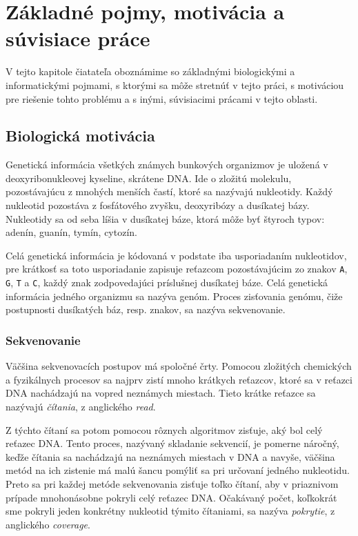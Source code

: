 \chapter{Základné pojmy, motivácia a súvisiace práce}

V tejto kapitole čiatateľa oboznámime so základnými biologickými
a informatickými pojmami, s ktorými sa môže stretnúť v tejto práci, s motiváciou
pre riešenie tohto problému a s inými, súvisiacimi prácami v tejto oblasti.

\section{Biologická motivácia}

Genetická informácia všetkých známych bunkových organizmov je uložená v
deoxyribonukleovej kyseline, skrátene DNA. Ide o zložitú molekulu, pozostávajúcu
z mnohých menších častí, ktoré sa nazývajú nukleotidy. Každý nukleotid pozostáva
z fosfátového zvyšku, deoxyribózy a dusíkatej bázy. Nukleotidy sa od seba líšia
v dusíkatej báze, ktorá môže byť štyroch typov: adenín, guanín, tymín, cytozín.

Celá genetická informácia je kódovaná v podstate iba usporiadaním nukleotidov,
pre krátkosť sa toto usporiadanie zapisuje reťazcom pozostávajúcim
zo znakov \verb_A_, \verb_G_, \verb_T_ a \verb_C_, každý znak zodpovedajúci
príslušnej dusíkatej báze. Celá genetická informácia jedného organizmu sa nazýva
genóm. Proces zisťovania genómu, čiže postupnosti dusíkatých báz, resp.
znakov, sa nazýva sekvenovanie.

\subsection{Sekvenovanie}

Väčšina sekvenovacích postupov má spoločné črty. Pomocou zložitých chemických
a fyzikálnych procesov sa najprv zistí mnoho krátkych reťazcov, ktoré sa
v reťazci DNA nachádzajú na vopred neznámych miestach. Tieto krátke reťazce
sa nazývajú \emph{čítania}, z anglického \emph{read}.

Z týchto čítaní sa potom pomocou rôznych algoritmov zisťuje, aký bol celý reťazec DNA.
Tento proces, nazývaný skladanie sekvencií, je pomerne náročný, keďže čítania sa nachádzajú na neznámych miestach
v DNA a navyše, väčšina metód na ich zistenie má malú šancu pomýliť sa pri určovaní
jedného nukleotidu. Preto sa pri každej metóde sekvenovania zisťuje toľko čítaní, aby
v priaznivom prípade mnohonásobne pokryli celý reťazec DNA. Očakávaný počet, koľkokrát
sme pokryli jeden konkrétny nukleotid týmito čítaniami, sa nazýva \emph{pokrytie},
z anglického \emph{coverage}.

